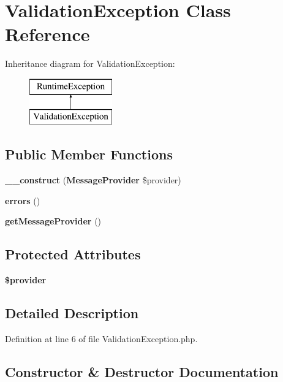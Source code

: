 \section{Validation\+Exception Class Reference}
\label{class_illuminate_1_1_contracts_1_1_validation_1_1_validation_exception}
Inheritance diagram for Validation\+Exception\+:\begin{figure}[H]
\begin{center}
\leavevmode
\includegraphics[height=2.000000cm]{class_illuminate_1_1_contracts_1_1_validation_1_1_validation_exception}
\end{center}
\end{figure}
\subsection*{Public Member Functions}
\begin{DoxyCompactItemize}
\item 
{\bf \+\_\+\+\_\+construct} ({\bf Message\+Provider} \$provider)
\item 
{\bf errors} ()
\item 
{\bf get\+Message\+Provider} ()
\end{DoxyCompactItemize}
\subsection*{Protected Attributes}
\begin{DoxyCompactItemize}
\item 
{\bf \$provider}
\end{DoxyCompactItemize}


\subsection{Detailed Description}


Definition at line 6 of file Validation\+Exception.\+php.



\subsection{Constructor \& Destructor Documentation}
